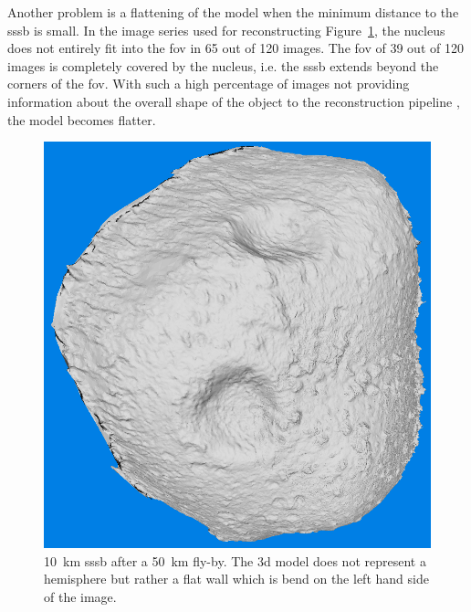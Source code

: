 Another problem is a flattening of the model when the minimum distance to the \gls{sssb} is small. In the image series used for reconstructing Figure~\ref{fig:model_flat}, the nucleus does not entirely fit into the \gls{fov} in \SI{65}{} out of \SI{120}{} images. The \gls{fov} of \SI{39}{} out of \SI{120}{} images is completely covered by the nucleus, i.e. the \gls{sssb} extends beyond the corners of the \gls{fov}. With such a high percentage of images not providing information about the overall shape of the object to the reconstruction pipeline , the model becomes flatter.

\begin{figure}[htb]
    \centering
    \includegraphics[width=.5\textwidth]{doc/thesis/0_figures/models_quality/50_10/120_50_10_refine1.png}
    \caption{\SI{10}{\kilo\meter} \gls{sssb} after a \SI{50}{\kilo\meter} fly-by. The \gls{3d} model does not represent a hemisphere but rather a flat wall which is bend on the left hand side of the image.}
    \label{fig:model_flat}
\end{figure}

